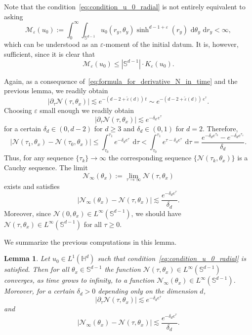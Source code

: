 \documentclass[12pt,longbibliography]{article}
\def\S{\mathbb{S}}
\def\d{\,\mathrm{d}}
\def\d{\,\mathrm{d}}
\def\H{\mathbb{H}}
\newtheorem{lem}[thm]{Lemma}
\theoremstyle{definition}
\theoremstyle{remark}
\theoremstyle{example}
\begin{document}
Note that the condition~\eqref{eq:condition_u_0_radial} is not entirely equivalent to asking
\[
\mathcal{M}_\varepsilon(u_0):= \int_0^\infty \int_{\S^{d-1}} u_0(r_y,\theta_y)\sinh^{d-1+\varepsilon}(r_y)\, \d \theta_y\, \d r_y <\infty,
\]
which can be understood as an $\varepsilon$-moment of the initial datum. It is, however, sufficient, since it is clear that
\[
\mathcal{M}_\varepsilon(u_0)\leq |\S^{d-1}|\cdot K_\varepsilon(u_0).
\]

Again, as a consequence of~\eqref{eq:formula_for_derivative_N_in_time} and the previous lemma, we readily obtain
\[
|\partial_\tau \mathcal{N}(\tau,\theta_x)|\lesssim e^{-(d-2+\tilde{\varepsilon}(d))\, t}\sim e^{-(d-2+\tilde{\varepsilon}(d))\, e^\tau}.
\]
Choosing $\varepsilon$ small enough we readily obtain
\[
|\partial_\tau \mathcal{N}(\tau,\theta_x)|\lesssim e^{-\delta_d\, e^\tau}
\]
for a certain $\delta_d\in (0, d-2)$ for $d\geq 3$ and $\delta_d\in (0,1)$ for $d=2$. Therefore,
\[
|\mathcal{N}(\tau_1,\theta_x) - \mathcal{N}(\tau_0,\theta_x)| \leq \int_{\tau_0}^{\tau_1} e^{-\delta_d e^\tau}\ \d \tau < \int_{\tau_0}^{\tau_1} e^{\tau-\delta_d e^\tau}\ \d \tau = \frac{e^{-\delta_d e^{\tau_0}}-e^{-\delta_d e^{\tau_1}}}{\delta_d}.
\]
Thus, for any sequence $\{\tau_k\}\to\infty$ the corresponding sequence $\{\mathcal{N}(\tau_k, \theta_x)\}$ is a Cauchy sequence. The limit
\[
\mathcal{N}_\infty(\theta_x):= \lim\limits_{\tau\to\infty}  \mathcal{N}(\tau, \theta_x)
\]
exists and satisfies
\[
|\mathcal{N}_\infty(\theta_x) - \mathcal{N}(\tau, \theta_x)|\lesssim \frac{e^{-\delta_d e^{\tau}}}{\delta_d}.
\]
Moreover, since $\mathcal{N}(0,\theta_x)\in L^\infty(\S^{d-1})$, we should have $\mathcal{N}(\tau,\theta_x)\in L^\infty(\S^{d-1})$ for all $\tau\geq 0$.

We summarize the previous computations in this lemma.

\begin{lem}\label{lem:bound_derivative_N_general datum}
	Let $u_0\in L^1(\H^d)$ such that condition~\eqref{eq:condition_u_0_radial} is satisfied. Then for all $\theta_x\in\mathbb{S}^{d-1}$ the function $\mathcal{N}(\tau,\theta_x)\in L^\infty(\S^{d-1})$ converges, as time grows to infinity, to a function $\mathcal{N}_\infty(\theta_x)\in L^\infty(\mathbb{S}^{d-1})$. Moreover, for a certain $\delta_d>0$ depending only on the dimension $d$,
	\[
	|\partial_\tau \mathcal{N}(\tau,\theta_x)|\lesssim e^{-\delta_d e^\tau}
	\]
	and
	\[
	|\mathcal{N}_\infty(\theta_x) - \mathcal{N}(\tau, \theta_x)|\lesssim \frac{e^{-\delta_d e^{\tau}}}{\delta_d}.
	\]
\end{lem}
\end{document}
